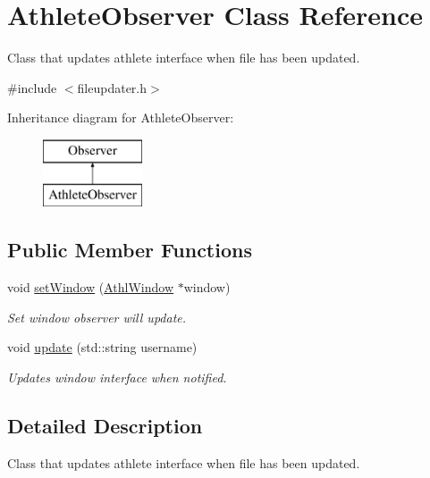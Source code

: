 \hypertarget{classAthleteObserver}{}\section{Athlete\+Observer Class Reference}
\label{classAthleteObserver}


Class that updates athlete interface when file has been updated.  




{\ttfamily \#include $<$fileupdater.\+h$>$}

Inheritance diagram for Athlete\+Observer\+:\begin{figure}[H]
\begin{center}
\leavevmode
\includegraphics[height=2.000000cm]{classAthleteObserver}
\end{center}
\end{figure}
\subsection*{Public Member Functions}
\begin{DoxyCompactItemize}
\item 
void \mbox{\hyperlink{classAthleteObserver_a585790e9f305e3602fe42481f8dc7b5d}{set\+Window}} (\mbox{\hyperlink{classAthlWindow}{Athl\+Window}} $\ast$window)
\begin{DoxyCompactList}\small\item\em Set window observer will update. \end{DoxyCompactList}\item 
void \mbox{\hyperlink{classAthleteObserver_adc653afe856672101bd935874967485e}{update}} (std\+::string username)
\begin{DoxyCompactList}\small\item\em Updates window interface when notified. \end{DoxyCompactList}\end{DoxyCompactItemize}


\subsection{Detailed Description}
Class that updates athlete interface when file has been updated. 

